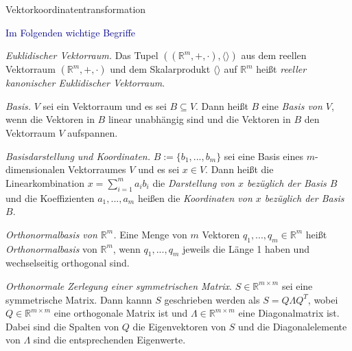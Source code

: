 \documentclass[
  8pt,
  ignorenonframetext,
]{beamer}
\begin{document}
\begin{frame}{Vektorkoordinatentransformation}
\protect\hypertarget{vektorkoordinatentransformation}{}
\small

\textcolor{darkblue}{Im Folgenden wichtige Begriffe}

\emph{Euklidischer Vektorraum.} Das Tupel
\(\left((\mathbb{R}^m, +, \cdot), \langle \rangle \right)\) aus dem
reellen Vektorraum \((\mathbb{R}^m, +, \cdot)\) und dem Skalarprodukt
\(\langle \rangle\) auf \(\mathbb{R}^m\) heißt
\textit{reeller kanonischer Euklidischer Vektorraum}. \vspace{2mm}

\emph{Basis.} \(V\) sei ein Vektorraum und es sei \(B \subseteq V\).
Dann heißt \(B\) eine \textit{Basis von $V$}, wenn die Vektoren in \(B\)
linear unabhängig sind und die Vektoren in \(B\) den Vektorraum \(V\)
aufspannen. \vspace{2mm}

\emph{Basisdarstellung und Koordinaten.} \(B := \{b_1,...,b_m\}\) sei
eine Basis eines \(m\)-dimensionalen Vektorraumes \(V\) und es sei
\(x \in V\). Dann heißt die Linearkombination
\(x = \sum_{i = 1}^m a_i b_i\) die \textit{Darstellung von
$x$ bezüglich der Basis $B$} und die Koeffizienten \(a_1,...,a_m\)
heißen die \textit{Koordinaten von $x$ bezüglich der Basis $B$}.
\vspace{2mm}

\emph{Orthonormalbasis von \(\mathbb{R}^m\).} Eine Menge von \(m\)
Vektoren \(q_1,...,q_m \in \mathbb{R}^m\) heißt
\textit{Orthonormalbasis} von \(\mathbb{R}^m\), wenn \(q_1,...,q_m\)
jeweils die Länge 1 haben und wechselseitig orthogonal sind.

\emph{Orthonormale Zerlegung einer symmetrischen Matrix}.
\(S \in \mathbb{R}^{m \times m}\) sei eine symmetrische Matrix. Dann
kannn \(S\) geschrieben werden als \(S = Q \Lambda Q^T\), wobei
\(Q \in \mathbb{R}^{m \times m}\) eine orthogonale Matrix ist und
\(\Lambda \in \mathbb{R}^{m\times m}\) eine Diagonalmatrix ist. Dabei
sind die Spalten von \(Q\) die Eigenvektoren von \(S\) und die
Diagonalelemente von \(\Lambda\) sind die entsprechenden Eigenwerte.
\end{frame}
\end{document}
